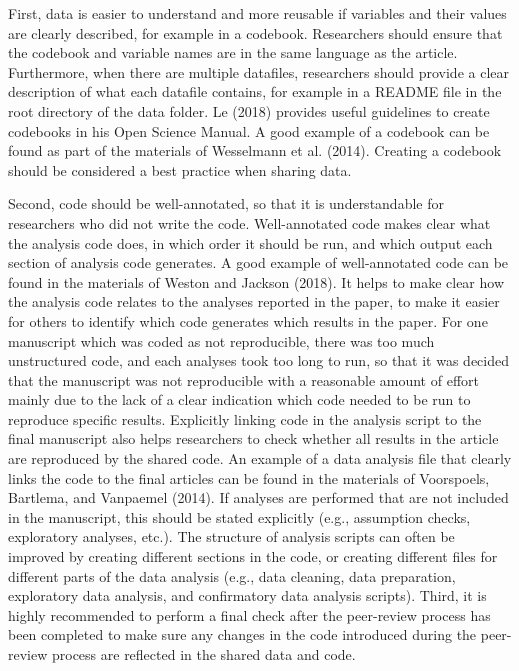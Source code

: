 \documentclass[,jou, a4paper,floatsintext]{apa6}
\begin{document}
First, data is easier to understand and more reusable if variables and their values are clearly described, for example in a codebook. Researchers should ensure that the codebook and variable names are in the same language as the article. Furthermore, when there are multiple datafiles, researchers should provide a clear description of what each datafile contains, for example in a README file in the root directory of the data folder. Le (2018) provides useful guidelines to create codebooks in his Open Science Manual. A good example of a codebook can be found as part of the materials of Wesselmann et al. (2014). Creating a codebook should be considered a best practice when sharing data.

Second, code should be well-annotated, so that it is understandable for researchers who did not write the code. Well-annotated code makes clear what the analysis code does, in which order it should be run, and which output each section of analysis code generates. A good example of well-annotated code can be found in the materials of Weston and Jackson (2018). It helps to make clear how the analysis code relates to the analyses reported in the paper, to make it easier for others to identify which code generates which results in the paper. For one manuscript which was coded as not reproducible, there was too much unstructured code, and each analyses took too long to run, so that it was decided that the manuscript was not reproducible with a reasonable amount of effort mainly due to the lack of a clear indication which code needed to be run to reproduce specific results. Explicitly linking code in the analysis script to the final manuscript also helps researchers to check whether all results in the article are reproduced by the shared code. An example of a data analysis file that clearly links the code to the final articles can be found in the materials of Voorspoels, Bartlema, and Vanpaemel (2014). If analyses are performed that are not included in the manuscript, this should be stated explicitly (e.g., assumption checks, exploratory analyses, etc.). The structure of analysis scripts can often be improved by creating different sections in the code, or creating different files for different parts of the data analysis (e.g., data cleaning, data preparation, exploratory data analysis, and confirmatory data analysis scripts). Third, it is highly recommended to perform a final check after the peer-review process has been completed to make sure any changes in the code introduced during the peer-review process are reflected in the shared data and code.
\end{document}
